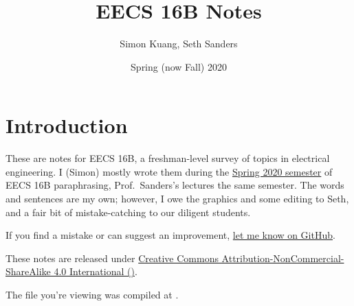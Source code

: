 \documentclass{../content16b}
\begin{document}
\title{EECS 16B Notes}
\author{Simon Kuang, Seth Sanders}
\date{Spring (now Fall) 2020}
\frontmatter
\maketitle

\section{Introduction}
These are notes for EECS 16B, a freshman-level survey of topics in electrical engineering. I (Simon) mostly wrote them during the \href{https://inst.eecs.berkeley.edu/~ee16b/sp20/}{Spring 2020 semester} of EECS 16B paraphrasing, Prof.~Sanders's lectures the same semester.
The words and sentences are my own; however, I owe the graphics and some editing to Seth, and a fair bit of mistake-catching to our diligent students.

If you find a mistake or can suggest an improvement, \href{https://github.com/simontheflutist/eecs16b-notes}{let me know on GitHub}.

These notes are released under \href{https://creativecommons.org/licenses/by-nc-sa/4.0/}{Creative Commons Attribution-NonCommercial-ShareAlike 4.0 International (\ccbyncsa)}.

The file you're viewing was compiled at \DTMnow.

\newpage
\tableofcontents
\newpage
\listoffigures

\mainmatter
\renewcommand{\printchaptername}{\chapnamefont Lecture}






\end{document}
